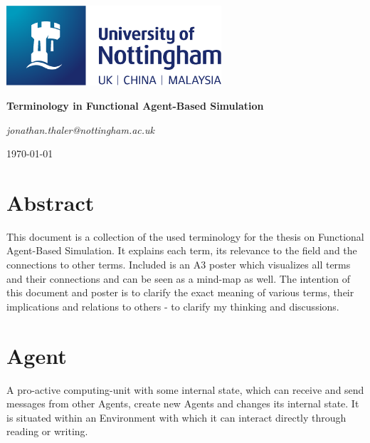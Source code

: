 \documentclass[oneside]{book}
\begin{document}
\begin{titlepage}
	\centering
	\includegraphics[width=0.60\textwidth]{../logo/UoN_Primary_Logo_RGB.png}\par\vspace{1cm}
	\vspace{1.5cm}
	{\huge\bfseries Terminology in Functional Agent-Based Simulation \par}
	\vspace{2cm}
	{\Large\itshape jonathan.thaler@nottingham.ac.uk \par}
	\vfill
	
	\vfill

	{\large \today\par}
\end{titlepage}

\cleardoublepage

\section*{Abstract}
This document is a collection of the used terminology for the thesis on Functional Agent-Based Simulation. It explains each term, its relevance to the field and the connections to other terms. Included is an A3 poster which visualizes all terms and their connections and can be seen as a mind-map as well.
The intention of this document and poster is to clarify the exact meaning of various terms, their implications and relations to others - to clarify my thinking and discussions.


\clearpage

\section*{Agent}
A pro-active computing-unit with some internal state, which can receive and send messages from other Agents, create new Agents and changes its internal state. It is situated within an Environment with which it can interact directly through reading or writing.
\end{document}
